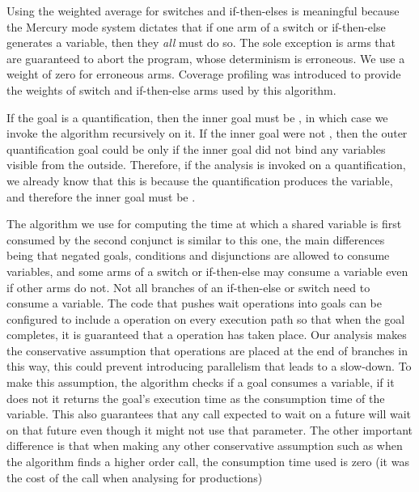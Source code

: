 Using the weighted average for switches and if-then-elses is meaningful because
the Mercury mode system dictates
that if one arm of a switch or if-then-else generates a variable,
then they \emph{all} must do so.
The sole exception is arms that are guaranteed to abort the program,
whose determinism is erroneous.
We use a weight of zero for erroneous arms.
Coverage profiling was introduced to provide the weights of switch and
if-then-else arms used by this algorithm.

If the goal is a quantification,
then the inner goal must be \ddet,
in which case we invoke the algorithm recursively on it.
If the inner goal were not \ddet,
then the outer quantification goal could be \ddet
only if the inner goal did not bind any variables visible from the outside.
Therefore, if the analysis is invoked on a quantification,
we already know that this is because the quantification produces the
variable, and therefore the inner goal must be \ddet.

The algorithm we use for computing the time
at which a shared variable is first consumed by the second conjunct
is similar to this one,
the main differences being that
negated goals, conditions and disjunctions are allowed to consume variables,
and some arms of a switch or if-then-else
may consume a variable even if other arms do not.
Not all branches of an if-then-else or switch need to consume a variable.
The code that pushes wait operations into goals can be configured to include
a \wait operation on every execution path so that when the goal completes,
it is guaranteed that a \wait operation has taken place.
Our analysis makes the conservative assumption that \wait operations are
placed at the end of branches in this way,
this could prevent introducing parallelism that leads to a slow-down.
To make this assumption,
the algorithm checks if a goal consumes a variable, if it does not it
returns the goal's execution time as the consumption time of the variable.
This also guarantees that any call expected to wait on a future will wait on
that future even though it might not use that parameter.
The other important difference is that when making
any other conservative assumption
such as when the algorithm finds a higher order call,
the consumption time used is zero
(it was the cost of the call when analysing for productions)

